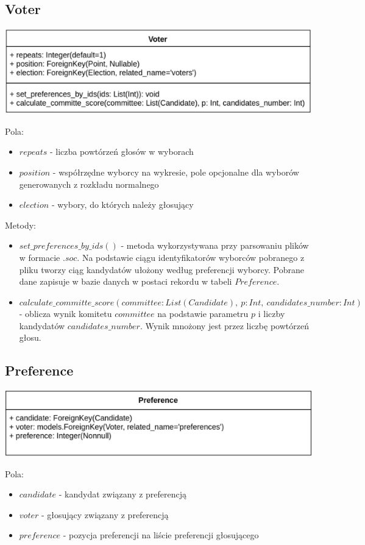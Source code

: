 \documentclass[pdflatex,11pt]{../aghdoc_version2}
\begin{document}
\subsection{Voter}
\begin{center}
\centerline{\includegraphics[scale=0.85]{pics/Voter.png}}
\end{center}
Pola:
\begin{itemize}
\item $repeats$ - liczba powtórzeń głosów w wyborach
\item $position$ - współrzędne wyborcy na wykresie, pole opcjonalne dla wyborów
generowanych z rozkładu normalnego
\item $election$ - wybory, do których należy głosujący
\end{itemize}
Metody:
\begin{itemize}
\item $set\_preferences\_by\_ids()$ - metoda wykorzystywana przy parsowaniu plików
w formacie $.soc$.
Na podstawie ciągu identyfikatorów wyborców pobranego z pliku tworzy ciąg kandydatów ułożony według preferencji wyborcy. Pobrane dane zapisuje w bazie
danych w postaci rekordu w tabeli $Preference$.
\item $calculate\_committe\_score(committee: List(Candidate), \ p: Int, \
candidates\_number: Int)$ - oblicza wynik komitetu $committee$ na podstawie
parametru $p$ i liczby kandydatów $candidates\_number$. Wynik mnożony jest przez
liczbę powtórzeń głosu.
\end{itemize}

\subsection{Preference}
\begin{center}
\centerline{\includegraphics[scale=0.85]{pics/Preference.png}}
\end{center}
Pola:
\begin{itemize}
\item $candidate$ - kandydat związany z preferencją
\item $voter$ - głosujący związany z preferencją
\item $preference$ - pozycja preferencji na liście preferencji głosującego 
\end{itemize}
\end{document}
